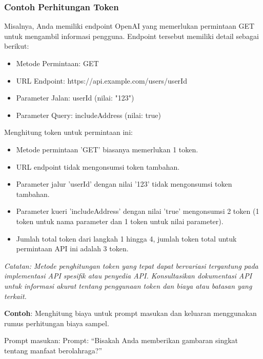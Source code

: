 \documentclass{article}
\begin{document}
\subsubsection{Contoh Perhitungan Token}
Misalnya, Anda memiliki endpoint OpenAI yang memerlukan permintaan GET untuk mengambil informasi pengguna. Endpoint tersebut memiliki detail sebagai berikut:
\begin{itemize}
    \item Metode Permintaan: GET
    \item URL Endpoint: https://api.example.com/users/{userId}
    \item Parameter Jalan: userId (nilai: "123")
    \item Parameter Query: includeAddress (nilai: true)
\end{itemize}
Menghitung token untuk permintaan ini:
\begin{itemize}
    \item Metode permintaan 'GET' biasanya memerlukan 1 token.
    \item URL endpoint tidak mengonsumsi token tambahan.
    \item Parameter jalur 'userId' dengan nilai '123' tidak mengonsumsi token tambahan.
    \item Parameter kueri 'includeAddress' dengan nilai 'true' mengonsumsi 2 token (1 token untuk nama parameter dan 1 token untuk nilai parameter).
    \item Jumlah total token dari langkah 1 hingga 4, jumlah token total untuk permintaan API ini adalah 3 token.
\end{itemize}

\textit{Catatan: Metode penghitungan token yang tepat dapat bervariasi tergantung pada implementasi API spesifik atau penyedia API. Konsultasikan dokumentasi API untuk informasi akurat tentang penggunaan token dan biaya atau batasan yang terkait.}

\textbf{Contoh}: Menghitung biaya untuk prompt masukan dan keluaran menggunakan rumus perhitungan biaya sampel.

Prompt masukan: Prompt: “Bisakah Anda memberikan gambaran singkat tentang manfaat berolahraga?”
\end{document}

